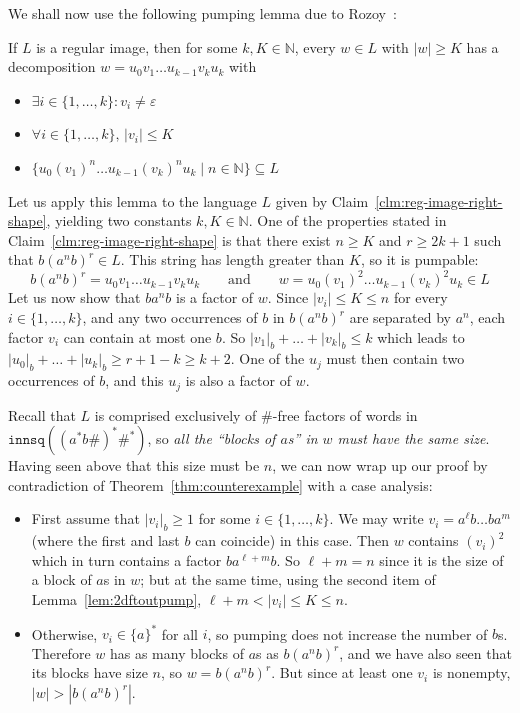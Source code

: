 \documentclass{fundam}
\newcommand{\bbN}{\mathbb{N}}
\theoremstyle{claimstyle}
\newcommand\innsq{\mathtt{innsq}}
\begin{document}
We shall now use the following pumping lemma due to Rozoy~{\cite[\S4.1]{Rozoy}}:
\begin{lemma}
\label{lem:2dftoutpump}
  If $L$ is a regular image, then for some $k,K \in \bbN$, every $w \in L$ with $|w| \geq K$ has a
  decomposition $w = u_{0} v_{1} \dots u_{k-1} v_{k} u_{k}$ with
   \begin{itemize}
     \item $\exists i \in \{1,\dots,k\} \colon v_{i} \neq \varepsilon$
     \item $\forall i \in \{1,\dots,k\},\, |v_{i}| \leq K$
     \item $\{u_{0} (v_{1})^{n} \dots u_{k-1} (v_{k})^{n} u_{k} \mid n \in\bbN\} \subseteq L$
   \end{itemize}
\end{lemma}
Let us apply this lemma to the language $L$ given by Claim~\ref{clm:reg-image-right-shape}, yielding two constants $k,K\in\bbN$. One of the properties stated in Claim~\ref{clm:reg-image-right-shape} is that there exist $n \geq K$ and $r \geq 2k+1$ such that $b(a^nb)^r \in L$. This string has length greater than $K$, so it is pumpable:
\[ b(a^nb)^r = u_0 v_1 \dots u_{k-1} v_k u_k \qquad\text{and}\qquad w = u_0 (v_1)^2 \dots u_{k-1} (v_k)^2 u_k \in L \]
Let us now show that $ba^nb$ is a factor of $w$. Since $|v_i| \leq K \leq n$ for every $i \in \{1,\dots,k\}$, and any two occurrences of $b$ in $b(a^nb)^r$ are separated by $a^n$, each factor $v_i$ can contain at most one $b$. So $|v_1|_b + \dots + |v_k|_b \leq k$ which leads to $|u_0|_b + \dots + |u_k|_b \geq r+1-k \geq k+2$. One of the $u_j$ must then contain two occurrences of $b$, and this $u_j$ is also a factor of $w$.

Recall that $L$ is comprised exclusively of $\#$-free factors of words in $\innsq((a^*b\#)^*\#^*)$, so \emph{all the \enquote{blocks of $a$s} in $w$ must have the same size}. Having seen above that this size must be $n$,
we can now wrap up our proof by contradiction of
Theorem~\ref{thm:counterexample} with a case analysis:
\begin{itemize}
  \item First assume that $|v_i|_b \geq 1$ for some $i \in \{1,\dots,k\}$. We may write $v_i = a^\ell b \dots b a^m$ (where the first and last $b$ can coincide) in this case. Then $w$ contains $(v_i)^2$ which in turn contains a factor $ba^{\ell+m}b$. So $\ell+m=n$ since it is the size of a block of $a$s in $w$; but at the same time, using the second item of Lemma~\ref{lem:2dftoutpump}, $\ell+m < |v_i| \leq K \leq n$.
  \item Otherwise, $v_i \in \{a\}^*$ for all $i$, so pumping does not increase the number of $b$s. Therefore $w$ has as many blocks of $a$s as $b(a^n b)^r$, and we have also seen that its blocks have size $n$, so $w = b(a^n b)^r$. But since at least one $v_i$ is nonempty, $|w| > |b(a^n b)^r|$.
\end{itemize}
\end{document}

